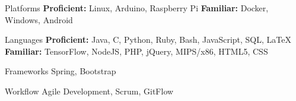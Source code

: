 
\vspace{0mm}
\begin{cvskills}

  \vspace{0mm}


  \cvskill
    {Platforms} %
    {\textbf{Proficient:} Linux, Arduino, Raspberry Pi \newline \textbf{Familiar:} Docker, Windows, Android} %

  \vspace{0mm}
  
  \cvskill
    {Languages} %
    {\textbf{Proficient:} Java, C, Python, Ruby, Bash, JavaScript, SQL, LaTeX \newline \textbf{Familiar:} TensorFlow, NodeJS, PHP, jQuery, MIPS/x86, HTML5, CSS} %

  \vspace{0mm}

  \cvskill
    {Frameworks} %
    {Spring, Bootstrap} %

  \vspace{0mm}

  \cvskill
    {Workflow} %
    {Agile Development, Scrum, GitFlow} %

\end{cvskills}